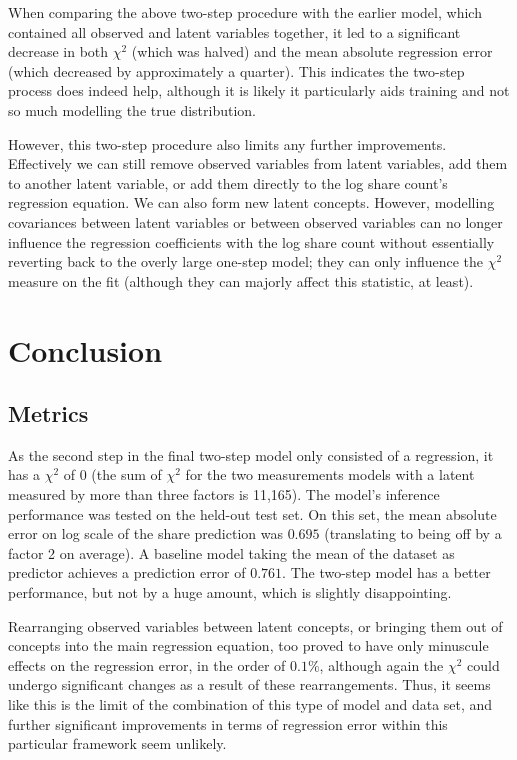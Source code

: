 \documentclass{article}
\begin{document}
When comparing the above two-step procedure with the earlier model, which contained all observed and latent variables together, it led to a significant decrease in both $\chi^2$ (which was halved) and the mean absolute regression error (which decreased by approximately a quarter). This indicates the two-step process does indeed help, although it is likely it particularly aids training and not so much modelling the true distribution.

However, this two-step procedure also limits any further improvements. Effectively we can still remove observed variables from latent variables, add them to another latent variable, or add them directly to the log share count's regression equation. We can also form new latent concepts. However, modelling covariances between latent variables or between observed variables can no longer influence the regression coefficients with the log share count without essentially reverting back to the overly large one-step model; they can only influence the $\chi^2$ measure on the fit (although they can majorly affect this statistic, at least). 

\section{Conclusion}
\subsection{Metrics}
As the second step in the final two-step model only consisted of a regression, it has a $\chi^2$ of 0 (the sum of $\chi^2$ for the two measurements models with a latent measured by more than three factors is 11,165).
The model's inference performance was tested on the held-out test set.
On this set, the mean absolute error on log scale of the share prediction was $0.695$ (translating to being off by a factor 2 on average).
A baseline model taking the mean of the dataset as predictor achieves a prediction error of $0.761$.
The two-step model has a better performance, but not by a huge amount, which is slightly disappointing.

Rearranging observed variables between latent concepts, or bringing them out of concepts into the main regression equation, too proved to have only minuscule effects on the regression error, in the order of $0.1\%$, although again the $\chi^2$ could undergo significant changes as a result of these rearrangements. Thus, it seems like this is the limit of the combination of this type of model and data set, and further significant improvements in terms of regression error within this particular framework seem unlikely.
\end{document}
